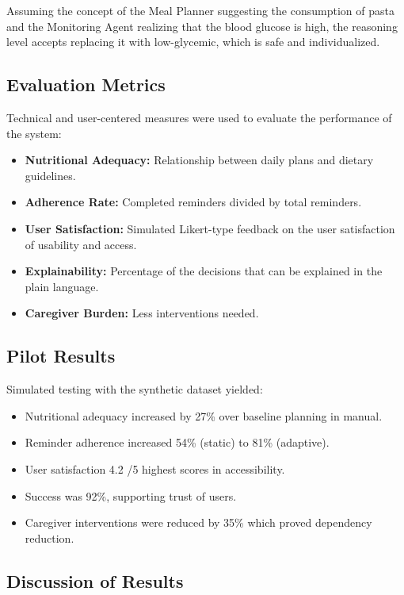 \documentclass[pdflatex,sn-mathphys-num]{sn-jnl}
\begin{document}
Assuming the concept of the Meal Planner suggesting the consumption of pasta and the Monitoring Agent realizing that the blood glucose is high, the reasoning level accepts replacing it with low-glycemic, which is safe and individualized.

\subsection{Evaluation Metrics}

Technical and user-centered measures were used to evaluate the performance of the system:

\begin{itemize}
	\item \textbf{Nutritional Adequacy:} Relationship between daily plans and dietary guidelines.
	\item \textbf{Adherence Rate:} Completed reminders divided by total reminders.
	\item \textbf{User Satisfaction:} Simulated Likert-type feedback on the user satisfaction of usability and access.
	\item \textbf{Explainability:} Percentage of the decisions that can be explained in the plain language.
	\item \textbf{Caregiver Burden:} Less interventions needed.
\end{itemize}

\subsection{Pilot Results}

Simulated testing with the synthetic dataset yielded:
\begin{itemize}
	\item Nutritional adequacy increased by 27\% over baseline planning in manual.
	\item Reminder adherence increased 54\% (static) to 81\% (adaptive).
	\item User satisfaction 4.2 /5 highest scores in accessibility.
	\item Success was 92\%, supporting trust of users.
	\item Caregiver interventions were reduced by 35\% which proved dependency reduction.
\end{itemize}

\subsection{Discussion of Results}
\end{document}
